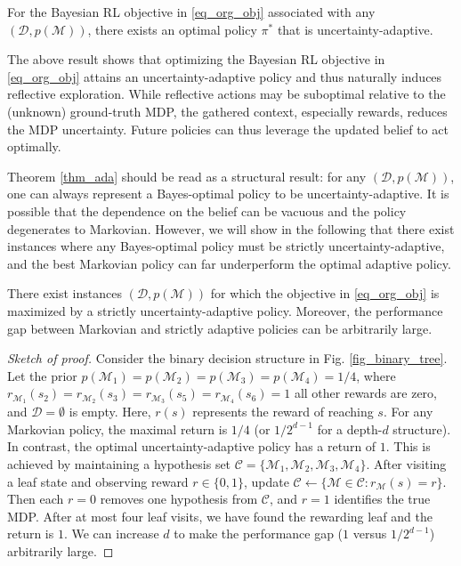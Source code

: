 \begin{theorem}
\label{thm_ada}
For the Bayesian RL objective in \eqref{eq_org_obj} associated with any $(\mathcal{D}, p(\mathcal{M}))$, there exists an optimal policy $\pi^*$ that is uncertainty-adaptive.
\end{theorem}
\vspace{-0.07cm}


The above result shows that optimizing the Bayesian RL objective in \eqref{eq_org_obj} attains an uncertainty-adaptive policy and thus naturally induces reflective exploration. While reflective actions may be suboptimal relative to the (unknown) ground-truth MDP, the gathered context, especially rewards, reduces the MDP uncertainty. Future policies can thus leverage the updated belief to act optimally. 

Theorem \ref{thm_ada} should be read as a structural result: for any $(\mathcal{D},p(\mathcal{M}))$, one can always represent a Bayes-optimal policy to be uncertainty-adaptive. It is possible that the dependence on the belief can be vacuous and the policy degenerates to Markovian. However, we will show in the following that there exist instances where any Bayes-optimal policy must be strictly uncertainty-adaptive, and the best Markovian policy can far underperform the optimal adaptive policy.

\begin{theorem}\label{thm_exp}
There exist instances $(\mathcal{D}, p(\mathcal{M}))$ for which the objective in \eqref{eq_org_obj} is maximized by a strictly uncertainty-adaptive policy. Moreover, the performance gap between Markovian and strictly adaptive policies can be arbitrarily large.
\end{theorem}
\vspace{-0.2cm}
\begin{proof}[Sketch of proof]
Consider the binary decision structure in Fig. \ref{fig_binary_tree}. Let the prior $p(\mathcal{M}_1) = p(\mathcal{M}_2)= p(\mathcal{M}_3) = p(\mathcal{M}_4) = 1/4$, where $r_{\mathcal{M}_1}(s_2) = r_{\mathcal{M}_2}(s_3) = r_{\mathcal{M}_3}(s_5) = r_{\mathcal{M}_4}(s_6) = 1$ all other rewards are zero, and $\mathcal{D}=\emptyset$ is empty. Here, $r(s)$ represents the reward of reaching $s$.
For any Markovian policy, the maximal return is $1/4$ (or $1/2^{d-1}$ for a depth-$d$ structure). In contrast, the optimal uncertainty-adaptive policy has a return of $1$. This is achieved by maintaining a hypothesis set $\mathcal{C} = \{\mathcal{M}_1,\mathcal{M}_2,\mathcal{M}_3,\mathcal{M}_4\}$. After visiting a leaf state and observing reward $r \in \{0,1\}$, update $\mathcal{C} \leftarrow \{\mathcal{M} \in \mathcal{C}: r_{\mathcal{M}}(s) = r\}$. Then each $r=0$ removes one hypothesis from $\mathcal{C}$, and $r=1$ identifies the true MDP. After at most four leaf visits, we have found the rewarding leaf and the return is $1$. We can increase $d$ to make the performance gap ($1$ versus $1/2^{d-1}$) arbitrarily large.
\end{proof}
\vspace{-0.1cm}

